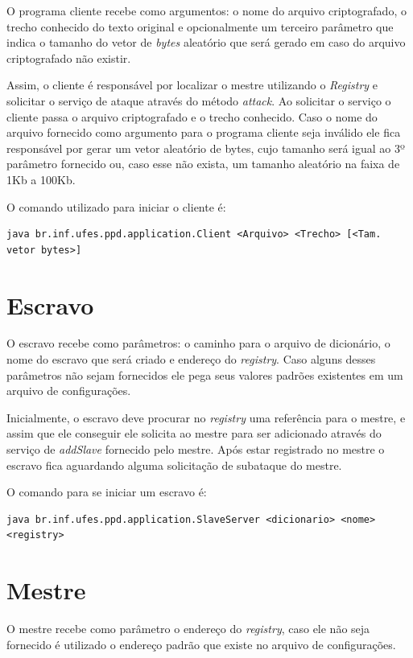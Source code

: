 \documentclass[
	12pt,				%
    oneside,			%
	a4paper,			%
	english,			%
	brazil,				%
	]{abntex2}
\begin{document}
O programa cliente recebe como argumentos: o nome do arquivo criptografado, o trecho conhecido do texto original e opcionalmente um terceiro parâmetro que indica o tamanho do vetor de \textit{bytes} aleatório que será gerado em caso do arquivo criptografado não existir.

Assim, o cliente é responsável por localizar o mestre utilizando o \textit{Registry} e solicitar o serviço de ataque através do método \textit{attack}. Ao solicitar o serviço o cliente passa o arquivo criptografado e o trecho conhecido. Caso o nome do arquivo fornecido como argumento para o programa cliente seja inválido ele fica responsável por gerar um vetor aleatório de bytes, cujo tamanho será igual ao 3º parâmetro fornecido ou, caso esse não exista, um tamanho aleatório na faixa de 1Kb a 100Kb.

O comando utilizado para iniciar o cliente é:

\begin{lstlisting}
java br.inf.ufes.ppd.application.Client <Arquivo> <Trecho> [<Tam. vetor bytes>]\end{lstlisting}


\section{Escravo}
O escravo recebe como parâmetros: o caminho para o arquivo de dicionário, o nome do escravo que será criado e endereço do \textit{registry}. Caso alguns desses parâmetros não sejam fornecidos ele pega seus valores padrões existentes em um arquivo de configurações.

Inicialmente, o escravo deve procurar no \textit{registry} uma referência para o mestre, e assim que ele conseguir ele solicita ao mestre para ser adicionado através do serviço de \textit{addSlave} fornecido pelo mestre. Após estar registrado
no mestre o escravo fica aguardando alguma solicitação de subataque do mestre. 

O comando para se iniciar um escravo é:

\begin{lstlisting}
java br.inf.ufes.ppd.application.SlaveServer <dicionario> <nome> <registry>\end{lstlisting}


\section{Mestre}

O mestre recebe como parâmetro o endereço do \textit{registry}, caso ele não seja fornecido é utilizado o endereço padrão
que existe no arquivo de configurações.
\end{document}
